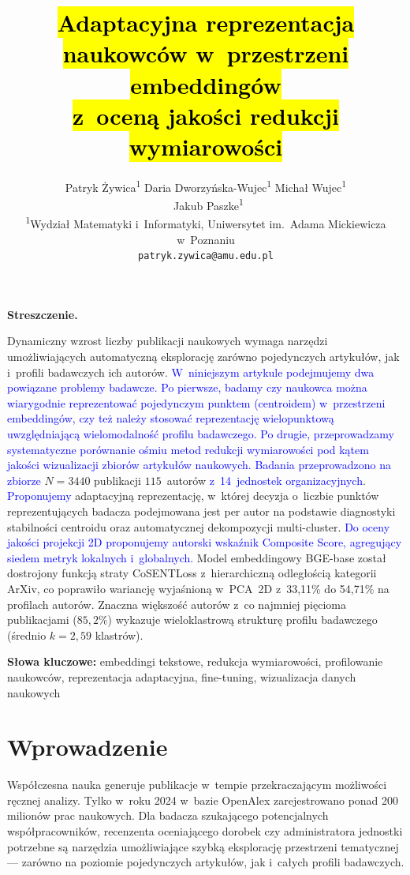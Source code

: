 \documentclass[a4paper,11pt,twocolumn]{article}
\title{%
  \Large\bfseries
  \hl{Adaptacyjna reprezentacja naukowców w~przestrzeni embeddingów}\\
  \hl{z~oceną jakości redukcji wymiarowości}%
}
\author{%
  Patryk Żywica\textsuperscript{1} \quad
  Daria Dworzyńska-Wujec\textsuperscript{1} \quad
  Michał Wujec\textsuperscript{1}\\\
  Jakub Paszke\textsuperscript{1}\\[4pt]
  \textsuperscript{1}Wydział Matematyki i~Informatyki,
  Uniwersytet im.~Adama Mickiewicza w~Poznaniu\\
  \texttt{patryk.zywica@amu.edu.pl}
}
\date{}
\newcommand{\hl}[1]{\textcolor{blue}{#1}}
\renewenvironment{abstract}{%
  \small\quotation\noindent\textbf{Streszczenie.}\enspace
}{\endquotation}
\begin{document}
\maketitle
\thispagestyle{empty}

\begin{abstract}
Dynamiczny wzrost liczby publikacji naukowych wymaga narzędzi umożliwiających
automatyczną eksplorację zarówno pojedynczych artykułów, jak i~profili
badawczych ich autorów.
\hl{W~niniejszym artykule podejmujemy dwa powiązane problemy badawcze.
Po pierwsze, badamy czy naukowca można wiarygodnie reprezentować
pojedynczym punktem (centroidem) w~przestrzeni embeddingów, czy też
należy stosować reprezentację wielopunktową uwzględniającą wielomodalność
profilu badawczego. Po drugie, przeprowadzamy systematyczne porównanie
ośmiu metod redukcji wymiarowości pod kątem jakości wizualizacji
zbiorów artykułów naukowych.}
\hl{Badania przeprowadzono na zbiorze} $N=3440$ publikacji
$115$~autorów \hl{z~14~jednostek organizacyjnych}.
\hl{Proponujemy} adaptacyjną reprezentację, w~której
decyzja o~liczbie punktów reprezentujących badacza
podejmowana jest per autor na podstawie diagnostyki
stabilności centroidu oraz automatycznej dekompozycji multi-cluster.
\hl{Do oceny jakości projekcji 2D proponujemy autorski wskaźnik
Composite Score, agregujący siedem metryk lokalnych i~globalnych.}
Model embeddingowy BGE-base został dostrojony funkcją straty CoSENTLoss
z~hierarchiczną odległością kategorii ArXiv, co poprawiło wariancję
wyjaśnioną w~PCA~2D z~33,11\% do 54,71\% na profilach autorów.
Znaczna większość autorów z~co najmniej pięcioma publikacjami ($85{,}2\%$) wykazuje wieloklastrową
strukturę profilu badawczego (średnio $k=2{,}59$ klastrów).
\end{abstract}

\smallskip\noindent
\textbf{Słowa kluczowe:}
embeddingi tekstowe, redukcja wymiarowości, profilowanie naukowców,
reprezentacja adaptacyjna, fine-tuning, wizualizacja danych naukowych

\section{Wprowadzenie}
\label{sec:intro}

Współczesna nauka generuje publikacje w~tempie przekraczającym możliwości
ręcznej analizy. Tylko w~roku 2024 w~bazie OpenAlex zarejestrowano ponad
200 milionów prac naukowych. Dla badacza szukającego potencjalnych
współpracowników, recenzenta oceniającego dorobek czy administratora
jednostki potrzebne są narzędzia umożliwiające szybką eksplorację
przestrzeni tematycznej --- zarówno na poziomie pojedynczych artykułów,
jak i~całych profili badawczych.
\end{document}
